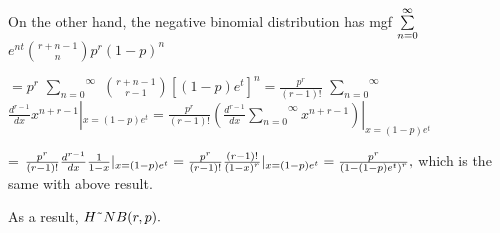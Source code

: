 \documentclass{article}
\begin{document}
On the other hand, the negative binomial distribution has mgf $\overset{%
\infty }{\underset{n=0}{\sum }}$ $e^{nt}\binom{r+n-1}{n}p^{r}\left(
1-p\right) ^{n}$

$=p^{r}$ $\overset{\infty }{\underset{n=0}{\sum }}$ $\binom{r+n-1}{r-1}\left[
\left( 1-p\right) e^{t}\right] ^{n}=\frac{p^{r}}{\left( r-1\right) !}$ $%
\overset{\infty }{\underset{n=0}{\sum }}$ $\frac{d^{r-1}}{dx}%
x^{n+r-1}|_{x=\left( 1-p\right) e^{t}}=\frac{p^{r}}{\left( r-1\right) !}%
\left( \frac{d^{r-1}}{dx}\overset{\infty }{\underset{n=0}{\sum }}%
x^{n+r-1}\right) |_{x=\left( 1-p\right) e^{t}}$

= $\frac{p^{r}}{\left( r-1\right) !}\frac{d^{r-1}}{dx}\frac{1}{1-x}%
|_{x=\left( 1-p\right) e^{t}}=\frac{p^{r}}{\left( r-1\right) !}\frac{\left(
r-1\right) !}{\left( 1-x\right) ^{r}}|_{x=\left( 1-p\right) e^{t}}=\frac{%
p^{r}}{\left( 1-\left( 1-p\right) e^{t}\right) ^{r}},$ which is the same
with above result.

As a result, $H\symbol{126}NB(r,p).$
\end{document}
